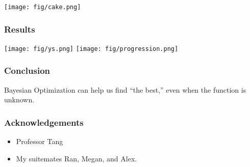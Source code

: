 \documentclass{beamer}
\begin{document}
\begin{frame}
    \begin{center}
        \texttt{[image: fig/cake.png]}
    \end{center}
\end{frame}

\begin{frame}
    \frametitle{Results}

    \texttt{[image: fig/ys.png]}
    \texttt{[image: fig/progression.png]}
\end{frame}

\begin{frame}
    \frametitle{Conclusion}
    Bayesian Optimization can help us find ``the best,'' even when the function is unknown.
\end{frame}

\begin{frame}
    \frametitle{Acknowledgements}
    \begin{itemize}
        \item Professor Tang
        \item My suitemates Ran, Megan, and Alex.
    \end{itemize}
\end{frame}
\end{document}
